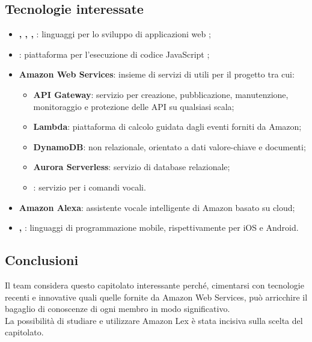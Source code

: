 \subsection{Tecnologie interessate}
\begin{itemize}
    \item \textbf{, , , }: linguaggi per lo sviluppo di applicazioni web ;
    \item \textbf{}: piattaforma  per l'esecuzione di codice JavaScript ;
    \item \textbf{Amazon Web Services}: insieme di servizi di  utili per il progetto tra cui:
    \begin{itemize}
        \item \textbf{API Gateway}: servizio per creazione, pubblicazione, manutenzione, monitoraggio e protezione delle API su qualsiasi scala;
        \item \textbf{Lambda}: piattaforma di calcolo  guidata dagli eventi forniti da Amazon;
        \item \textbf{DynamoDB}:  non relazionale, orientato a dati valore-chiave e documenti;
        \item \textbf{Aurora Serverless}: servizio di database relazionale;
        \item \textbf{}: servizio per  i comandi vocali.
    \end{itemize}  
    \item \textbf{Amazon Alexa}: assistente vocale intelligente di Amazon basato su cloud;
    \item \textbf{, }: linguaggi di programmazione mobile, rispettivamente per iOS e Android.
\end{itemize}   

\subsection{Conclusioni}
Il team considera questo capitolato interessante perché, cimentarsi con 
tecnologie recenti e innovative quali quelle fornite da Amazon Web Services,
può arricchire il bagaglio di conoscenze di ogni membro in modo significativo.\\
La possibilità di studiare e utilizzare Amazon Lex è stata incisiva sulla scelta del capitolato.

